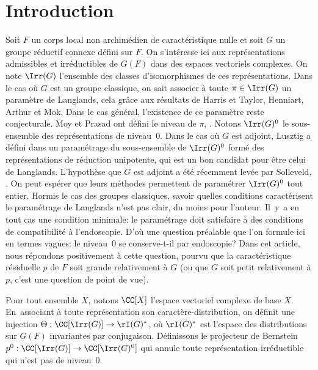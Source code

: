 \Changel

\vspace*{-1.2\baselineskip}\vskip0pt
\enlargethispage{.3\baselineskip}%
\section*{Introduction}

Soit $F$ un corps local non archimédien de caractéristique nulle et soit $G$ un groupe réductif connexe défini sur $F$. On s'intéresse ici aux représentations admissibles et irréductibles de $G(F)$ dans des espaces vectoriels complexes. On note $\Irr(G)$ l'ensemble des classes d'isomorphismes de ces représentations. Dans le cas où $G$ est un groupe classique, on sait associer à toute $\pi\in \Irr(G)$ un paramètre de Langlands, cela grâce aux résultats de Harris et Taylor, Henniart, Arthur et Mok. Dans le cas général, l'existence de ce paramètre reste conjecturale.
Moy et Prasad ont défini le niveau de $\pi$, \cf \cite[Th.\,5.2]{MP1}. Notons $\Irr(G)^0$ le sous-ensemble des représentations de niveau~$0$. Dans le cas où $G$ est adjoint, Lusztig a défini dans \cite{Lu} un paramétrage du sous-ensemble de $\Irr(G)^0$ formé des représentations de réduction unipotente, qui est un bon candidat pour être celui de Langlands. L'hypothèse que $G$ est adjoint a été récemment levée par Solleveld, \cf \cite{S}. On peut espérer que leurs méthodes permettent de paramétrer $\Irr(G)^0$ tout entier.
Hormis le cas des groupes classiques, savoir quelles conditions caractérisent le paramétrage de Langlands n'est pas clair, du moins pour l'auteur. Il~y~a en tout cas une condition minimale: le paramétrage doit satisfaire à des conditions de compatibilité à l'endoscopie. D'où une question préalable que l'on formule ici en termes vagues: le niveau~$0$ se conserve-t-il par endoscopie? Dans cet article, nous répondons positivement à cette question, pourvu que la caractéristique résiduelle $p$ de $F$ soit grande relativement à $G$ (ou que $G$ soit petit relativement à $p$, c'est une question de point de vue).

Pour tout ensemble $X$, notons $\CC[X]$ l'espace vectoriel complexe de base $X$. En~associant à toute représentation son caractère-distribution, on définit une injection $\Theta:\CC[\Irr(G)] \to \rI(G)^*$, où $\rI(G)^*$ est l'espace des distributions sur $G(F)$ invariantes par conjugaison. Définissons le projecteur de Bernstein $p^0:\CC[\Irr(G)]\to \CC[\Irr(G)^0]$ qui annule toute représentation irréductible qui n'est pas de niveau~$0$.

